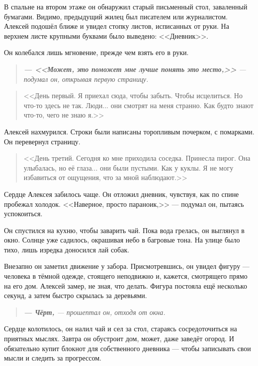 \documentclass[12pt,a4paper]{book}
\newenvironment{dialogue}{\begin{quote}\itshape}{\end{quote}}
\begin{document}
В спальне на втором этаже он обнаружил старый письменный стол, заваленный бумагами. Видимо, предыдущий жилец был писателем или журналистом. Алексей подошёл ближе и увидел стопку листов, исписанных от руки. На верхнем листе крупными буквами было выведено: <<Дневник>>.

Он колебался лишь мгновение, прежде чем взять его в руки.
\begin{dialogue}
\textbf{--- <<Может, это поможет мне лучше понять это место,>>} --- подумал он, открывая первую страницу.
\end{dialogue}

\begin{quote}
<<День первый. Я приехал сюда, чтобы забыть. Чтобы исцелиться. Но что-то здесь не так. Люди... они смотрят на меня странно. Как будто знают что-то, чего не знаю я.>>
\end{quote}

Алексей нахмурился. Строки были написаны торопливым почерком, с помарками. Он перевернул страницу.
\begin{quote}
<<День третий. Сегодня ко мне приходила соседка. Принесла пирог. Она улыбалась, но её глаза... они были пустыми. Как у куклы. Я не могу избавиться от ощущения, что за мной наблюдают.>>
\end{quote}

Сердце Алексея забилось чаще. Он отложил дневник, чувствуя, как по спине пробежал холодок. <<Наверное, просто параноик,>> --- подумал он, пытаясь успокоиться.

Он спустился на кухню, чтобы заварить чай. Пока вода грелась, он выглянул в окно. Солнце уже садилось, окрашивая небо в багровые тона. На улице было тихо, лишь изредка доносился лай собак.

Внезапно он заметил движение у забора. Присмотревшись, он увидел фигуру --- человека в тёмной одежде, стоящего неподвижно и, кажется, смотрящего прямо на его дом. Алексей замер, не зная, что делать. Фигура постояла ещё несколько секунд, а затем быстро скрылась за деревьями.

\begin{dialogue}
\textbf{--- Чёрт,} --- прошептал он, отходя от окна.
\end{dialogue}

Сердце колотилось, он налил чай и сел за стол, стараясь сосредоточиться на приятных мыслях. Завтра он обустроит дом, может, даже заведёт огород. И обязательно купит блокнот для собственного дневника --- чтобы записывать свои мысли и следить за прогрессом.
\end{document}
